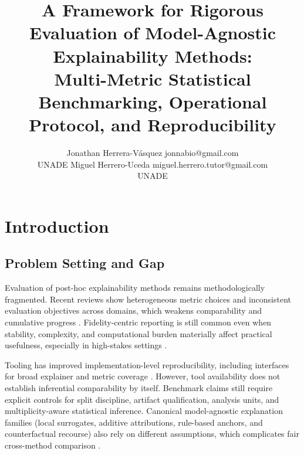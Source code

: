 \documentclass[twoside,11pt]{article}
\begin{document}
\title{A Framework for Rigorous Evaluation of Model-Agnostic Explainability Methods:\\
Multi-Metric Statistical Benchmarking, Operational Protocol, and Reproducibility}

\author{
\name Jonathan Herrera-V\'asquez \email jonnabio@gmail.com \\
\addr UNADE
\AND
\name Miguel Herrero-Uceda \email miguel.herrero.tutor@gmail.com \\
\addr UNADE
}

\editor{}

\maketitle

\begin{abstract}

\end{abstract}

\begin{keywords}

\end{keywords}

\section{Introduction}

\subsection{Problem Setting and Gap}
Evaluation of post-hoc explainability methods remains methodologically fragmented.
Recent reviews show heterogeneous metric choices and inconsistent evaluation
objectives across domains, which weakens comparability and cumulative progress
\citep{kadir2023metrics,pawlicki2024multiple,adadi2018xai,arrieta2020xai}.
Fidelity-centric reporting is still common even when stability, complexity, and
computational burden materially affect practical usefulness, especially in
high-stakes settings \citep{rudin2019stop}.

Tooling has improved implementation-level reproducibility, including interfaces
for broad explainer and metric coverage \citep{li2022interpretdl,hedstrom2023quantus}.
However, tool availability does not establish inferential comparability by
itself. Benchmark claims still require explicit controls for split discipline,
artifact qualification, analysis units, and multiplicity-aware statistical
inference.
Canonical model-agnostic explanation families (local surrogates, additive
attributions, rule-based anchors, and counterfactual recourse) also rely on
different assumptions, which complicates fair cross-method comparison
\citep{ribeiro2016lime,lundberg2017shap,ribeiro2018anchors,mothilal2020dice}.
\end{document}
